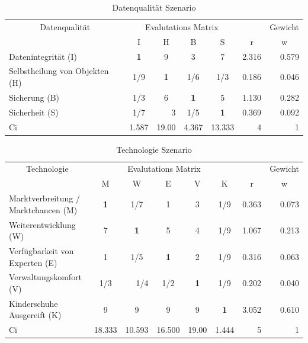 \begin{table}[htbp]
\caption{Datenqualität Szenario}
\begin{tabular}{|l|c|c|c|c|r|r|}
\hline
\multicolumn{ 1}{|c|}{Datenqualität} & \multicolumn{ 4}{c|}{Evalutations Matrix} & \multicolumn{1}{l|}{} & \multicolumn{1}{l|}{Gewicht} \\ \cline{ 2- 7}
\multicolumn{ 1}{|c|}{} & I & H & B & S & \multicolumn{1}{c|}{r} & \multicolumn{1}{c|}{w} \\ \hline
Datenintegrität (I) & \textbf{1} & 9 & 3 & 7 & 2.316 & 0.579 \\ \hline
Selbstheilung von Objekten (H) &  1/9 & \textbf{1} &  1/6 &  1/3 & 0.186 & 0.046 \\ \hline
Sicherung (B) &  1/3 & 6 & \textbf{1} & 5 & 1.130 & 0.282 \\ \hline
Sicherheit (S) &  1/7 & \multicolumn{1}{r|}{3    } &  1/5 & \textbf{1} & 0.369 & 0.092 \\ \hline  \hline
Ci & \multicolumn{1}{r|}{1.587} & \multicolumn{1}{r|}{19.00} & \multicolumn{1}{r|}{4.367} & \multicolumn{1}{r|}{13.333} & 4 & 1 \\ \hline
\end{tabular}
\label{AHPDatenqualitätS}
\end{table}

\begin{table}[htbp]
\caption{Technologie Szenario}
\begin{tabular}{|p{3.9cm}|c|c|c|c|c|r|r|}
\hline
\multicolumn{ 1}{|c|}{Technologie} & \multicolumn{ 5}{c|}{Evalutations Matrix} & \multicolumn{1}{l|}{} & \multicolumn{1}{l|}{Gewicht} \\ \cline{ 2- 8}
\multicolumn{ 1}{|c|}{} & M & W & E & V & K & \multicolumn{1}{c|}{r} & \multicolumn{1}{c|}{w} \\ \hline
Marktverbreitung / Marktchancen (M) & \textbf{1} &  1/7 & 1 & 3 &  1/9 & 0.363 & 0.073 \\ \hline
Weiterentwicklung (W) & 7 & \textbf{1} & 5 & 4 &  1/9 & 1.067 & 0.213 \\ \hline
Verfügbarkeit von Experten (E) & 1 &  1/5 & \textbf{1} & 2 &  1/9 & 0.316 & 0.063 \\ \hline
Verwaltungskomfort (V) &  1/3 & \multicolumn{1}{r|}{ 1/4} &  1/2 & \textbf{1} &  1/9 & 0.202 & 0.040 \\ \hline
Kinderschuhe Ausgereift (K) & 9 & 9 & 9 & 9 & \textbf{1} & 3.052 & 0.610 \\ \hline  \hline
Ci & \multicolumn{1}{r|}{18.333} & \multicolumn{1}{r|}{10.593} & \multicolumn{1}{r|}{16.500} & \multicolumn{1}{r|}{19.00} & \multicolumn{1}{r|}{1.444} & 5 & 1 \\ \hline
\end{tabular}
\label{AHPTechnologieS}
\end{table}


